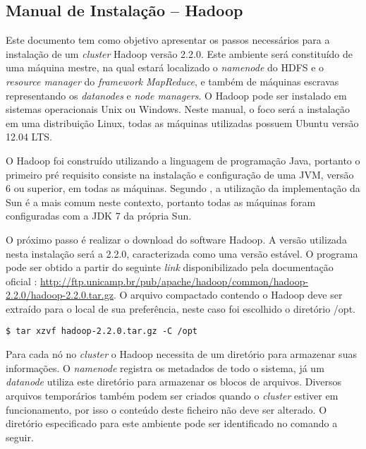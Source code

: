 \begin{apendicesenv}

\chapter{Manual de Instalação – Hadoop}
\label{apd-hadoop}

Este documento tem como objetivo apresentar os passos necessários para a instalação de um \textit{cluster} Hadoop versão 2.2.0. Este ambiente será constituído de uma máquina mestre, na qual estará localizado o \textit{namenode} do HDFS e o \textit{resource manager} do \textit{framework} \textit{MapReduce}, e também de máquinas escravas representando os \textit{datanodes} e \textit{node managers}. O Hadoop pode ser instalado em sistemas operacionais Unix ou Windows. Neste manual, o foco será a instalação em uma distribuição Linux, todas as máquinas utilizadas possuem Ubuntu versão 12.04 LTS.

O Hadoop foi construído utilizando a linguagem de programação Java, portanto o primeiro pré requisito consiste na instalação e configuração de uma JVM, versão 6 ou superior, em todas as máquinas. Segundo , a utilização da implementação da Sun é a mais comum neste contexto, portanto todas as máquinas foram configuradas com a JDK 7 da própria Sun.

O próximo passo é realizar o download do software Hadoop. A versão utilizada nesta instalação será a 2.2.0, caracterizada como uma versão estável. O programa pode ser obtido a partir do seguinte \textit{link} disponibilizado pela documentação oficial \cite{hadoopSite}: \url{http://ftp.unicamp.br/pub/apache/hadoop/common/hadoop-2.2.0/hadoop-2.2.0.tar.gz}. O arquivo compactado contendo o Hadoop deve ser extraído para o local de sua preferência, neste caso foi escolhido o diretório /opt.

\begin{lstlisting}[style=abnt,frame=single]
$ tar xzvf hadoop-2.2.0.tar.gz -C /opt
\end{lstlisting}

Para cada nó no \textit{cluster} o Hadoop necessita de um diretório para armazenar suas informações. O \textit{namenode} registra os metadados de todo o sistema, já um \textit{datanode} utiliza este diretório para armazenar os blocos de arquivos. Diversos arquivos temporários também podem ser criados quando o \textit{cluster} estiver em funcionamento, por isso o conteúdo deste ficheiro não deve ser alterado. O diretório especificado para este ambiente pode ser identificado no comando a seguir.


\end{apendicesenv}
